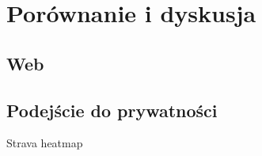 \section{Porównanie i dyskusja}

\subsection{Web}

\subsection{Podejście do prywatności}
Strava heatmap
